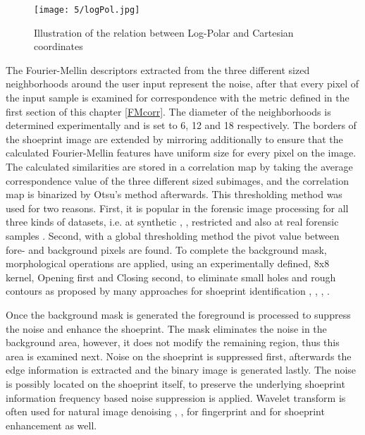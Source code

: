 \documentclass[draft,final]{vutinfth} %
\begin{document}
\begin{figure}[h]
  \centering
  \texttt{[image: 5/logPol.jpg]}
  \caption{Illustration of the relation between Log-Polar and Cartesian coordinates \cite{sarvaiya2012image}}
  \label{fig:sans:logPol} %
\end{figure}

\par
The Fourier-Mellin descriptors extracted from the three different sized neighborhoods around the user input represent the noise, after that every pixel of the input sample is examined for correspondence with the metric defined in the first section of this chapter \ref{FMcorr}.
The diameter of the neighborhoods is determined experimentally and is set to 6, 12 and 18 respectively.
The borders of the shoeprint image are extended by mirroring additionally to ensure that the calculated Fourier-Mellin features have uniform size for every pixel on the image.
The calculated similarities are stored in a correlation map by taking the average correspondence value of the three different sized subimages, and the correlation map is binarized by Otsu's method afterwards.
This thresholding method was used for two reasons.
First, it is popular in the forensic image processing for all three kinds of datasets, i.e. at synthetic \cite{algarni2008novel}, \cite{alizadeh2017automatic}, restricted \cite{kong2014novel} and also at real forensic samples \cite{wu2019crime}.
Second, with a global thresholding method the pivot value between fore- and background pixels are found.
To complete the background mask, morphological operations are applied, using an experimentally defined, 8x8 kernel, Opening first and Closing second, to eliminate small holes and rough contours as proposed by many approaches for shoeprint identification \cite{wang2014automatic}, \cite{kong2014novel}, \cite{li2014retrieval}, \cite{tang2010footwear}.
\par
Once the background mask is generated the foreground is processed to suppress the noise and enhance the shoeprint.
The mask eliminates the noise in the background area, however, it does not modify the remaining region, thus this area is examined next.
Noise on the shoeprint is suppressed first, afterwards the edge information is extracted and the binary image is generated lastly.
The noise is possibly located on the shoeprint itself, to preserve the underlying shoeprint information frequency based noise suppression is applied.
Wavelet transform is often used for natural image denoising \cite{xu2016image}, \cite{sugamya2016image}, for fingerprint \cite{li2012texture} and for shoeprint enhancement \cite{katireddy2017novel} as well.
\end{document}
